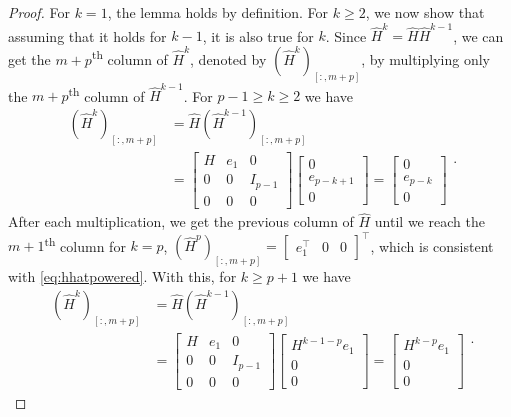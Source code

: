 \begin{proof}
    For $k=1$, the lemma holds by definition. For $k \ge 2$, we now show that assuming that it holds for $k-1$, it is also
    true for $k$. Since $\hat{H}^k = \hat{H} \hat{H}^{k-1}$, we can get the $m+p$\textsuperscript{th} column
    of $\hat{H}^k$, denoted by $(\hat{H}^k)_{[:, m+p]}$, by multiplying only the $m+p$\textsuperscript{th}
    column of $\hat{H}^{k-1}$. For $p-1 \ge k \ge 2$ we have
    \begin{equation*}
        \begin{aligned}
            (\hat{H}^k)_{[:, m+p]} & = \hat{H} (\hat{H}^{k-1})_{[:, m+p]} \\
            & =
            \begin{bmatrix} H & e_1 & 0\\ 0 & 0 & I_{p-1}\\ 0 & 0 & 0 \end{bmatrix}
            \begin{bmatrix} 0 \\ e_{p-k+1} \\ 0 \end{bmatrix}
            =
            \begin{bmatrix} 0 \\ e_{p-k} \\ 0 \end{bmatrix}
        \end{aligned}.
    \end{equation*}
    After each multiplication, we get the previous column of $\hat{H}$ until we reach the $m+1$\textsuperscript{th} column
    for $k=p$, $(\hat{H}^p)_{[:, m+p]} = \begin{bmatrix}e_1^\top & 0 & 0\end{bmatrix}^\top$, which is consistent with \eqref{eq:hhatpowered}.
    With this, for $k \ge p+1$ we have
    \begin{equation*}
        \begin{aligned}
            (\hat{H}^k)_{[:, m+p]} & = \hat{H} (\hat{H}^{k-1})_{[:, m+p]} \\
            & =
            \begin{bmatrix} H & e_1 & 0\\ 0 & 0 & I_{p-1}\\ 0 & 0 & 0 \end{bmatrix}
            \begin{bmatrix} H^{k-1-p} e_1 \\ 0 \\ 0 \end{bmatrix}
            =
            \begin{bmatrix} H^{k-p} e_1 \\ 0 \\ 0 \end{bmatrix}
        \end{aligned}.
    \end{equation*}
\end{proof}


